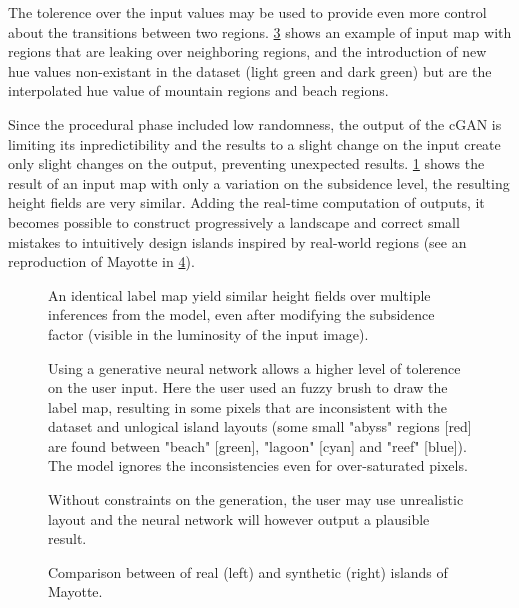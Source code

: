 \documentclass{egpubl}
\begin{document}
The tolerence over the input values may be used to provide even more control about the transitions between two regions. \cref{fig:coral-island_results_dino} shows an example of input map with regions that are leaking over neighboring regions, and the introduction of new hue values non-existant in the dataset (light green and dark green) but are the interpolated hue value of mountain regions and beach regions.

Since the procedural phase included low randomness, the output of the cGAN is limiting its inpredictibility and the results to a slight change on the input create only slight changes on the output, preventing unexpected results. \cref{fig:coral-island_results-subsidence} shows the result of an input map with only a variation on the subsidence level, the resulting height fields are very similar. Adding the real-time computation of outputs, it becomes possible to construct progressively a landscape and correct small mistakes to intuitively design islands inspired by real-world regions (see an reproduction of Mayotte in \cref{fig:coral-island_example-Mayotte}). 


\begin{figure}
    \caption{An identical label map yield similar height fields over multiple inferences from the model, even after modifying the subsidence factor (visible in the luminosity of the input image).}
    \label{fig:coral-island_results-subsidence}
\end{figure}
\begin{figure}
    \caption{Using a generative neural network allows a higher level of tolerence on the user input. Here the user used an fuzzy brush to draw the label map, resulting in some pixels that are inconsistent with the dataset and unlogical island layouts (some small "abyss" regions [red] are found between "beach" [green], "lagoon" [cyan] and "reef" [blue]). The model ignores the inconsistencies even for over-saturated pixels. }
    \label{fig:coral-island_results-fuzzy}
\end{figure}
\begin{figure}
    \caption{Without constraints on the generation, the user may use unrealistic layout and the neural network will however output a plausible result.}
    \label{fig:coral-island_results_dino}
\end{figure}
\begin{figure}
    \caption{Comparison between of real (left) and synthetic (right) islands of Mayotte.}
    \label{fig:coral-island_example-Mayotte}
\end{figure}
\end{document}
